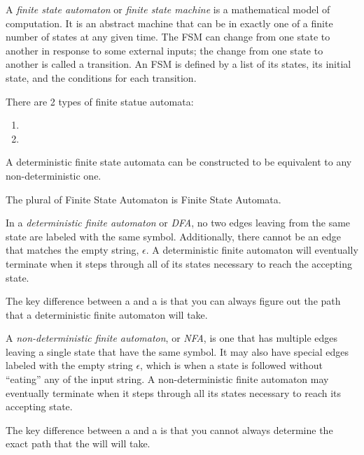 \begin{definition}\label{def:Finite State Automaton}
  A \emph{finite state automaton} or \emph{finite state machine} is a mathematical model of computation.
  It is an abstract machine that can be in exactly one of a finite number of states at any given time.
  The FSM can change from one state to another in response to some external inputs; the change from one state to another is called a transition.
  An FSM is defined by a list of its states, its initial state, and the conditions for each transition.

  There are 2 types of finite statue automata:
  \begin{enumerate}
  \item {}
  \item {}
  \end{enumerate}

  A deterministic finite state automata can be constructed to be equivalent to any non-deterministic one.

  \begin{remark}
    The plural of Finite State Automaton is Finite State Automata.
  \end{remark}
\end{definition}

\begin{definition}\label{def:DeterministicFiniteAutomataDFA}
  In a \emph{deterministic finite automaton} or \emph{DFA}, no two edges leaving from the same state are labeled with the same symbol.
  Additionally, there cannot be an edge that matches the empty string, $\epsilon$.
  A deterministic finite automaton will eventually terminate when it steps through all of its states necessary to reach the accepting state.
  
  The key difference between a  and a  is that you can always figure out the path that a deterministic finite automaton will take.
\end{definition}

\begin{definition}\label{def:Non-deterministicFiniteAutomataNFA}
  A \emph{non-deterministic finite automaton}, or \emph{NFA}, is one that has multiple edges leaving a single state that have the same symbol.
  It may also have special edges labeled with the empty string $\epsilon$, which is when a state is followed without ``eating'' any of the input string.
  A non-deterministic finite automaton may eventually terminate when it steps through all its states necessary to reach its accepting state.
  
  The key difference between a  and a  is that you cannot always determine the exact path that the  will will take.
\end{definition}


